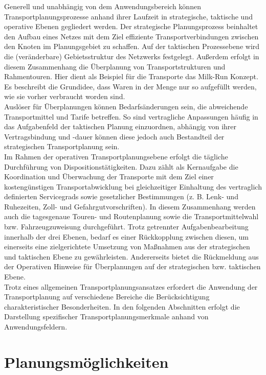\documentclass[a4paper,12pt]{scrreprt}
\begin{document}
	Generell und unabhängig von dem Anwendungsbereich können Transportplanungsprozesse anhand ihrer Laufzeit in strategische, taktische und operative Ebenen gegliedert werden. Der strategische Planungsprozess beinhaltet den Aufbau eines Netzes mit dem Ziel effiziente Transportverbindungen zwischen den Knoten im Planungsgebiet zu schaffen. Auf der taktischen Prozessebene wird die (veränderbare) Gebietsstruktur des Netzwerks festgelegt. Außerdem erfolgt in diesem Zusammenhang die Überplanung von Transportstrukturen und Rahmentouren. Hier dient als Beispiel für die Transporte das Milk-Run Konzept. Es beschreibt die Grundidee, dass Waren in der Menge nur so aufgefüllt werden, wie sie vorher verbraucht worden sind.\\
	
	Auslöser für Überplanungen können Bedarfsänderungen sein, die abweichende Transportmittel und Tarife betreffen. So sind vertragliche Anpassungen häufig in das Aufgabenfeld der taktischen Planung einzuordnen, abhängig von ihrer Vertragsbindung und -dauer können diese jedoch auch Bestandteil der strategischen Transportplanung sein.\\
	
	Im Rahmen der operativen Transportplanungsebene erfolgt die tägliche Durchführung von Dispositionstätigkeiten. Dazu zählt als Kernaufgabe die Koordination und Überwachung der Transporte mit dem Ziel einer kostengünstigen Transportabwicklung bei gleichzeitiger Einhaltung des vertraglich definierten Servicegrads sowie gesetzlicher Bestimmungen (z. B. Lenk- und Ruhezeiten, Zoll- und Gefahrgutvorschriften). In diesem Zusammenhang werden auch die tagesgenaue Touren- und Routenplanung sowie die Transportmittelwahl bzw. Fahrzeugzuweisung durchgeführt. Trotz getrennter Aufgabenbearbeitung innerhalb der drei Ebenen, bedarf es einer Rückkopplung zwischen diesen, um einerseits eine zielgerichtete Umsetzung von Maßnahmen aus der strategischen und taktischen Ebene zu gewährleisten. Andererseits bietet die Rückmeldung aus der Operativen Hinweise für Überplanungen auf der strategischen bzw. taktischen Ebene.\\ 
	
	Trotz eines allgemeinen Transportplanungsansatzes erfordert die Anwendung der Transportplanung auf verschiedene Bereiche die Berücksichtigung charakteristischer Besonderheiten. In den folgenden Abschnitten erfolgt die Darstellung spezifischer Transportplanungsmerkmale anhand von Anwendungsfeldern.
	

	\chapter{Planungsmöglichkeiten}
\end{document}

